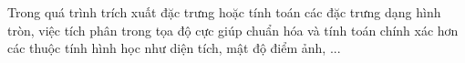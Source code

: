 \documentclass[preview]{standalone}
\begin{document}
\begin{center}
Trong quá trình trích xuất đặc trưng hoặc tính toán các đặc trưng dạng hình tròn, việc tích phân trong tọa độ cực giúp chuẩn hóa và tính toán chính xác hơn các thuộc tính hình học như diện tích, mật độ điểm ảnh, ...
\end{center}
\end{document}
